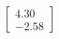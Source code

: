\documentclass[preview]{standalone}
\begin{document}
\begin{align*}
\begin{bmatrix} 4.30 \\ -2.58 \end{bmatrix}
\end{align*}
\end{document}
